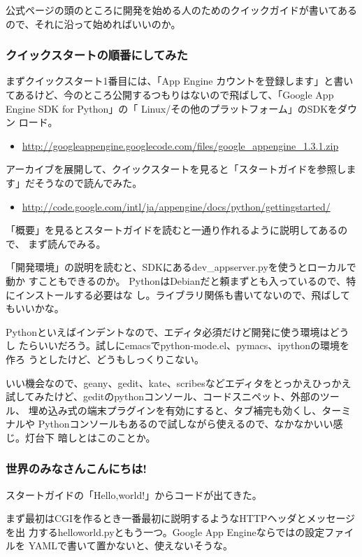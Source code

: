 \documentclass[mingoth,a4paper]{jsarticle}
\begin{document}
公式ページの頭のところに開発を始める人のためのクイックガイドが書いてある
ので、それに沿って始めればいいのか。

\subsubsection{クイックスタートの順番にしてみた}

まずクイックスタート1番目には、「App Engine カウントを登録します」と書い
てあるけど、今のところ公開するつもりはないので飛ばして、「Google App
Engine SDK for Python」の「 Linux/その他のプラットフォーム」のSDKをダウン
ロード。

\begin{itemize}
 \item \url{http://googleappengine.googlecode.com/files/google_appengine_1.3.1.zip}
\end{itemize}

アーカイブを展開して、クイックスタートを見ると「スタートガイドを参照しま
す」だそうなので読んでみた。
\begin{itemize}
 \item \url{http://code.google.com/intl/ja/appengine/docs/python/gettingstarted/}
\end{itemize}

「概要」を見るとスタートガイドを読むと一通り作れるように説明してあるので、
まず読んでみる。

「開発環境」の説明を読むと、SDKにあるdev\_appserver.pyを使うとローカルで動か
すこともできるのか。
PythonはDebianだと頼まずとも入っているので、特にインストールする必要はな
し。ライブラリ関係も書いてないので、飛ばしてもいいかな。

Pythonといえばインデントなので、エディタ必須だけど開発に使う環境はどうし
たらいいだろう。試しにemacsでpython-mode.el、pymacs、ipythonの環境を作ろ
うとしたけど、どうもしっくりこない。

いい機会なので、geany、gedit、kate、scribesなどエディタをとっかえひっかえ
試してみたけど、geditのpythonコンソール、コードスニペット、外部のツール、
埋め込み式の端末プラグインを有効にすると、タブ補完も効くし、ターミナルや
Pythonコンソールもあるので試しながら使えるので、なかなかいい感じ。灯台下
暗しとはこのことか。

\subsubsection{世界のみなさんこんにちは!}
スタートガイドの「Hello,world!」からコードが出てきた。

まず最初はCGIを作るとき一番最初に説明するようなHTTPヘッダとメッセージを出
力するhelloworld.pyともう一つ。Google App Engineならではの設定ファイルを
YAMLで書いて置かないと、使えないそうな。
\end{document}
